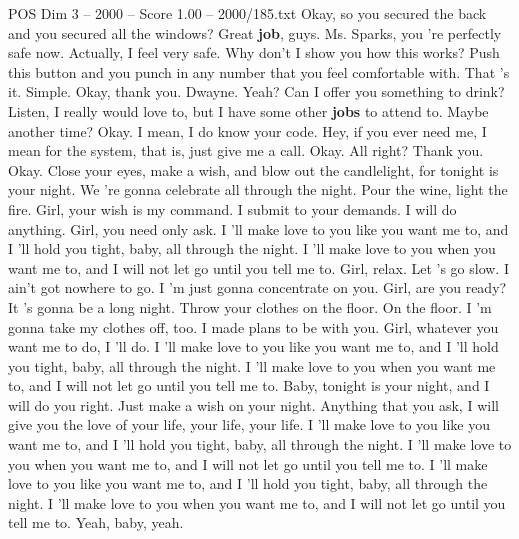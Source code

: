 \begin{textsample}{POS Dim 3 – 2000 – Score 1.00 – 2000/185.txt}  \label{ex:f3_pos_038}
Okay, so you secured the back and you secured all the windows?
Great \textbf{job}, guys.
Ms.
Sparks, you 're perfectly safe now.
Actually, I feel very safe.
Why don't I show you how this works?
Push this button and you punch in any number that you feel comfortable with.
That 's it.
Simple.
Okay, thank you.
Dwayne.
Yeah?
Can I offer you something to drink?
Listen, I really would love to, but I have some other \textbf{jobs} to attend to.
Maybe another time?
Okay.
I mean, I do know your code.
Hey, if you ever need me, I mean for the system, that is, just give me a call.
Okay.
All right?
Thank you.
Okay.
Close your eyes, make a wish, and blow out the candlelight, for tonight is your night.
We 're gonna celebrate all through the night.
Pour the wine, light the fire.
Girl, your wish is my command.
I submit to your demands.
I will do anything.
Girl, you need only ask.
I 'll make love to you like you want me to, and I 'll hold you tight, baby, all through the night.
I 'll make love to you when you want me to, and I will not let go until you tell me to.
Girl, relax.
Let 's go slow.
I ain't got nowhere to go.
I 'm just gonna concentrate on you.
Girl, are you ready?
It 's gonna be a long night.
Throw your clothes on the floor.
On the floor.
I 'm gonna take my clothes off, too.
I made plans to be with you.
Girl, whatever you want me to do, I 'll do.
I 'll make love to you like you want me to, and I 'll hold you tight, baby, all through the night.
I 'll make love to you when you want me to, and I will not let go until you tell me to.
Baby, tonight is your night, and I will do you right.
Just make a wish on your night.
Anything that you ask, I will give you the love of your life, your life, your life.
I 'll make love to you like you want me to, and I 'll hold you tight, baby, all through the night.
I 'll make love to you when you want me to, and I will not let go until you tell me to.
I 'll make love to you like you want me to, and I 'll hold you tight, baby, all through the night.
I 'll make love to you when you want me to, and I will not let go until you tell me to.
Yeah, baby, yeah.

\end{textsample}
